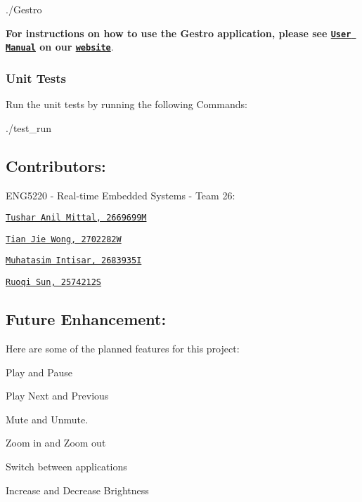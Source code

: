 \begin{DoxyCode}
./Gestro
\end{DoxyCode}
 {\bfseries For instructions on how to use the Gestro application, please see \href{https://randomguy-coder.github.io/Gestro/user_manual.html}{\tt User Manual} on our \href{https://randomguy-coder.github.io/Gestro/}{\tt website}}.

\subsubsection*{Unit Tests}

Run the unit tests by running the following Commands\+: 
\begin{DoxyCode}
./test\_run
\end{DoxyCode}


\subsection*{Contributors\+:}

E\+N\+G5220 -\/ Real-\/time Embedded Systems -\/ Team 26\+:
\begin{DoxyItemize}
\item \href{https://github.com/RandomGuy-coder}{\tt Tushar Anil Mittal, 2669699M}
\item \href{https://github.com/terrsoshi}{\tt Tian Jie Wong, 2702282W}
\item \href{https://github.com/MuhatasimIntisar}{\tt Muhatasim Intisar, 2683935I}
\item \href{https://github.com/David2574}{\tt Ruoqi Sun, 2574212S}
\end{DoxyItemize}

\subsection*{Future Enhancement\+:}

Here are some of the planned features for this project\+:
\begin{DoxyItemize}
\item Play and Pause
\item Play Next and Previous
\item Mute and Unmute.
\item Zoom in and Zoom out
\item Switch between applications
\item Increase and Decrease Brightness
\end{DoxyItemize}

